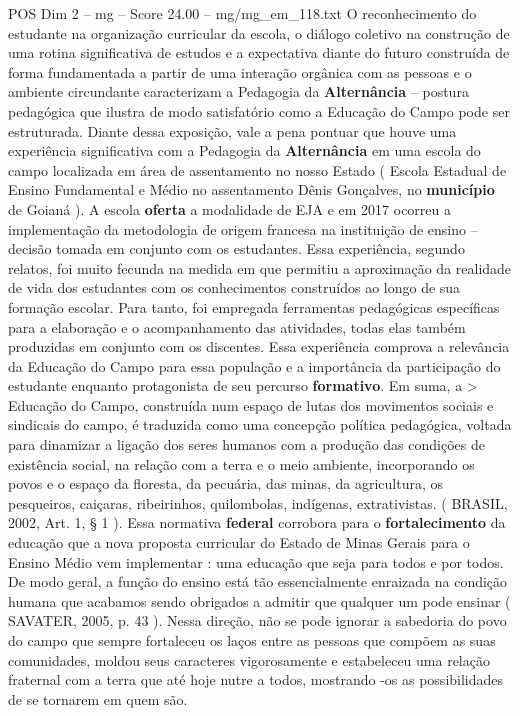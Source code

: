 \begin{textsample}{POS Dim 2 – mg – Score 24.00 – mg/mg\_em\_118.txt}
O reconhecimento do estudante na organização curricular da escola, o diálogo coletivo na construção de uma rotina significativa de estudos e a expectativa diante do futuro construída de forma fundamentada a partir de uma interação orgânica com as pessoas e o ambiente circundante caracterizam a Pedagogia da \textbf{Alternância} – postura pedagógica que ilustra de modo satisfatório como a Educação do Campo pode ser estruturada.
Diante dessa exposição, vale a pena pontuar que houve uma experiência significativa com a Pedagogia da \textbf{Alternância} em uma escola do campo localizada em área de assentamento no nosso Estado ( Escola Estadual de Ensino Fundamental e Médio no assentamento Dênis Gonçalves, no \textbf{município} de Goianá ).
A escola \textbf{oferta} a modalidade de EJA e em 2017 ocorreu a implementação da metodologia de origem francesa na instituição de ensino – decisão tomada em conjunto com os estudantes.
Essa experiência, segundo relatos, foi muito fecunda na medida em que permitiu a aproximação da realidade de vida dos estudantes com os conhecimentos construídos ao longo de sua formação escolar.
Para tanto, foi empregada ferramentas pedagógicas específicas para a elaboração e o acompanhamento das atividades, todas elas também produzidas em conjunto com os discentes.
Essa experiência comprova a relevância da Educação do Campo para essa população e a importância da participação do estudante enquanto protagonista de seu percurso \textbf{formativo}.
Em suma, a > Educação do Campo, construída num espaço de lutas dos movimentos sociais e sindicais do campo, é traduzida como uma concepção política pedagógica, voltada para dinamizar a ligação dos seres humanos com a produção das condições de existência social, na relação com a terra e o meio ambiente, incorporando os povos e o espaço da floresta, da pecuária, das minas, da agricultura, os pesqueiros, caiçaras, ribeirinhos, quilombolas, indígenas, extrativistas. ( BRASIL, 2002, Art. 1, § 1 ).
Essa normativa \textbf{federal} corrobora para o \textbf{fortalecimento} da educação que a nova proposta curricular do Estado de Minas Gerais para o Ensino Médio vem implementar : uma educação que seja para todos e por todos.
De modo geral, a função do ensino está tão essencialmente enraizada na condição humana que acabamos sendo obrigados a admitir que qualquer um pode ensinar ( SAVATER, 2005, p. 43 ).
Nessa direção, não se pode ignorar a sabedoria do povo do campo que sempre fortaleceu os laços entre as pessoas que compõem as suas comunidades, moldou seus caracteres vigorosamente e estabeleceu uma relação fraternal com a terra que até hoje nutre a todos, mostrando -os as possibilidades de se tornarem em quem são.

\end{textsample}
